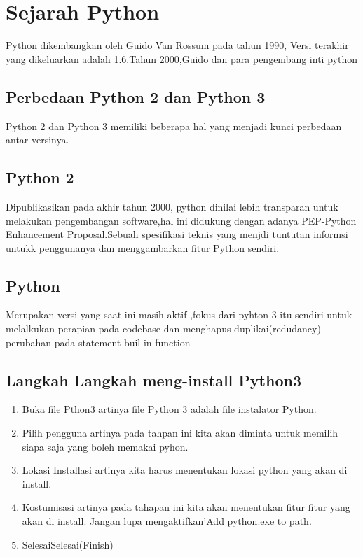 \section{Sejarah Python}
    Python dikembangkan oleh Guido Van Rossum pada tahun 1990, Versi terakhir yang dikeluarkan adalah 1.6.Tahun 2000,Guido dan para pengembang inti python 
\subsection{Perbedaan Python 2 dan Python 3}
    Python 2 dan Python 3 memiliki beberapa hal yang menjadi kunci perbedaan antar versinya.
\subsection{Python 2}
    Dipublikasikan pada akhir tahun 2000, python dinilai lebih transparan untuk melakukan pengembangan software,hal ini didukung dengan adanya PEP-Python Enhancement Proposal.Sebuah spesifikasi teknis yang menjdi tuntutan informsi untukk penggunanya dan menggambarkan fitur Python sendiri.
\subsection{Python }
    Merupakan versi yang saat ini masih aktif ,fokus dari pyhton 3 itu sendiri untuk melalkukan perapian pada codebase dan menghapus duplikai(redudancy) perubahan pada statement buil in function
\subsection{Langkah Langkah meng-install Python3}
\begin{enumerate}
    \item Buka file Pthon3 artinya file Python 3 adalah file instalator Python.
    \item Pilih pengguna artinya pada tahpan ini kita akan diminta untuk memilih siapa saja yang boleh memakai pyhon.
    \item Lokasi Installasi artinya kita harus menentukan lokasi python yang akan di install.
    \item Kostumisasi artinya pada tahapan ini kita akan menentukan fitur fitur yang akan di install. Jangan lupa mengaktifkan'Add python.exe to path.
    \item SelesaiSelesai(Finish)
\end{enumerate}
